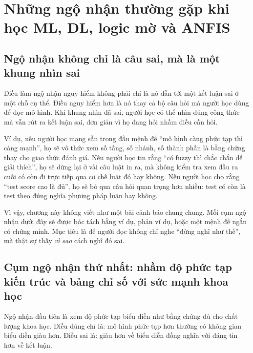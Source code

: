 \chapter{Những ngộ nhận thường gặp khi học ML, DL, logic mờ và ANFIS}

\section{Ngộ nhận không chỉ là câu sai, mà là một khung nhìn sai}

Điều làm ngộ nhận nguy hiểm không phải chỉ là nó dẫn tới một kết luận sai ở một chỗ cụ thể. Điều nguy hiểm hơn là nó thay cả bộ câu hỏi mà người học dùng để đọc mô hình. Khi khung nhìn đã sai, người học có thể nhìn đúng công thức mà vẫn rút ra kết luận sai, đơn giản vì họ đang hỏi nhầm điều cần hỏi.

Ví dụ, nếu người học mang sẵn trong đầu mệnh đề ``mô hình càng phức tạp thì càng mạnh'', họ sẽ vô thức xem số tầng, số nhánh, số thành phần là bằng chứng thay cho giao thức đánh giá. Nếu người học tin rằng ``có fuzzy thì chắc chắn dễ giải thích'', họ sẽ dừng lại ở vài câu luật in ra, mà không kiểm tra xem đầu ra cuối có còn đi trực tiếp qua cơ chế luật đó hay không. Nếu người học cho rằng ``test score cao là đủ'', họ sẽ bỏ qua câu hỏi quan trọng hơn nhiều: test có còn là test theo đúng nghĩa phương pháp luận hay không.

Vì vậy, chương này không viết như một bài cảnh báo chung chung. Mỗi cụm ngộ nhận dưới đây sẽ được bóc tách bằng ví dụ, phản ví dụ, hoặc một mệnh đề ngắn có chứng minh. Mục tiêu là để người đọc không chỉ nghe ``đừng nghĩ như thế'', mà thật sự thấy \emph{vì sao} cách nghĩ đó sai.

\section{Cụm ngộ nhận thứ nhất: nhầm độ phức tạp kiến trúc và bảng chỉ số với sức mạnh khoa học}

Ngộ nhận đầu tiên là xem độ phức tạp biểu diễn như bằng chứng đủ cho chất lượng khoa học. Điều đúng chỉ là: mô hình phức tạp hơn thường có không gian biểu diễn giàu hơn. Điều sai là: giàu hơn về biểu diễn đồng nghĩa với đáng tin hơn về kết luận.

